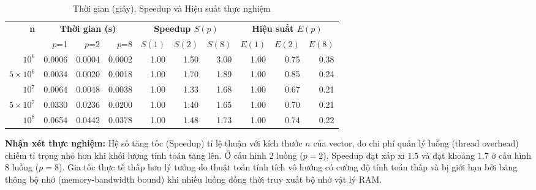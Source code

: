\begin{table}[H]
  \centering
  \caption{Thời gian (giây), Speedup và Hiệu suất thực nghiệm}
  \label{tab:dot_benchmark}
  \vspace{0.2cm}
  \small
  \begin{tabular}{r|rrr|rrr|rrr}
    \toprule
    \textbf{n}    & \multicolumn{3}{c|}{\textbf{Thời gian (s)}} & \multicolumn{3}{c|}{\textbf{Speedup $S(p)$}} & \multicolumn{3}{c}{\textbf{Hiệu suất $E(p)$}}                                                       \\
                  & $p$=1                                       & $p$=2                                        & $p$=8                                         & $S(1)$ & $S(2)$ & $S(8)$ & $E(1)$ & $E(2)$ & $E(8)$ \\
    \midrule
    $10^6$        & 0.0006                                      & 0.0004                                       & 0.0002                                        & 1.00   & 1.50   & 3.00   & 1.00   & 0.75   & 0.38   \\
    $5\times10^6$ & 0.0034                                      & 0.0020                                       & 0.0018                                        & 1.00   & 1.70   & 1.89   & 1.00   & 0.85   & 0.24   \\
    $10^7$        & 0.0064                                      & 0.0048                                       & 0.0038                                        & 1.00   & 1.33   & 1.68   & 1.00   & 0.67   & 0.21   \\
    $5\times10^7$ & 0.0330                                      & 0.0236                                       & 0.0200                                        & 1.00   & 1.40   & 1.65   & 1.00   & 0.70   & 0.21   \\
    $10^8$        & 0.0654                                      & 0.0442                                       & 0.0378                                        & 1.00   & 1.48   & 1.73   & 1.00   & 0.74   & 0.22   \\
    \bottomrule
  \end{tabular}

  \vspace{0.3cm}
  \small
\end{table}
\textbf{Nhận xét thực nghiệm:} Hệ số tăng tốc (Speedup) tỉ lệ thuận với kích thước $n$ của vector, do chi phí quản lý luồng (thread overhead) chiếm tỉ trọng nhỏ hơn khi khối lượng tính toán tăng lên. Ở cấu hình 2 luồng ($p=2$), Speedup đạt xấp xỉ $1.5$ và đạt khoảng $1.7$ ở cấu hình 8 luồng ($p=8$). Gia tốc thực tế thấp hơn lý tưởng do thuật toán tính tích vô hướng có cường độ tính toán thấp và bị giới hạn bởi băng thông bộ nhớ (memory-bandwidth bound) khi nhiều luồng đồng thời truy xuất bộ nhớ vật lý RAM.

